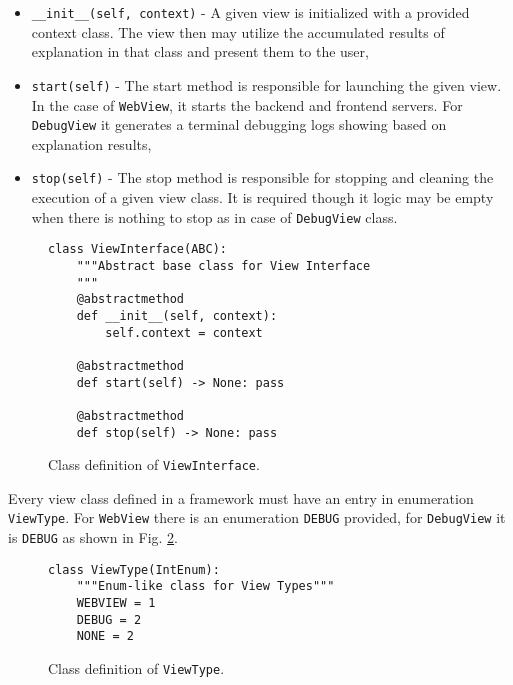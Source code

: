 \documentclass[
    bindingoffset=5mm,  %
    footnoteindent=3mm, %
    hyphenation=true    %
]{src/wut-thesis}
\begin{document}
\begin{itemize}
    \item \texttt{__init__(self, context)} - A given view is initialized with a provided context class.
    The view then may utilize the accumulated results of explanation in that class and present them to the user,

    \item \texttt{start(self)} - The start method is responsible for launching the given view. In the case of \texttt{WebView},
    it starts the backend and frontend servers. For \texttt{DebugView} it generates a terminal debugging logs showing based on 
    explanation results,
    
    \item \texttt{stop(self)} - The stop method is responsible for stopping and cleaning the execution of a given view class. It is required though it logic may be empty when there is nothing to stop as in case of \texttt{DebugView} class.
\end{itemize}

\begin{figure}%
\begin{verbatim}
class ViewInterface(ABC):
    """Abstract base class for View Interface
    """
    @abstractmethod
    def __init__(self, context):
        self.context = context

    @abstractmethod
    def start(self) -> None: pass

    @abstractmethod
    def stop(self) -> None: pass    
\end{verbatim}
\caption{Class definition of \texttt{ViewInterface}.}
\label{fig:ViewInterface}
\end{figure}

Every view class defined in a framework must have an entry in enumeration \texttt{ViewType}.
For \texttt{WebView} there is an enumeration \texttt{DEBUG} provided, for \texttt{DebugView}
it is \texttt{DEBUG} as shown in Fig. \ref{fig:ViewType}.

\begin{figure}%
\begin{verbatim}
class ViewType(IntEnum):
    """Enum-like class for View Types"""
    WEBVIEW = 1
    DEBUG = 2
    NONE = 2
\end{verbatim}
\caption{Class definition of \texttt{ViewType}.}
\label{fig:ViewType}
\end{figure}
\end{document}
